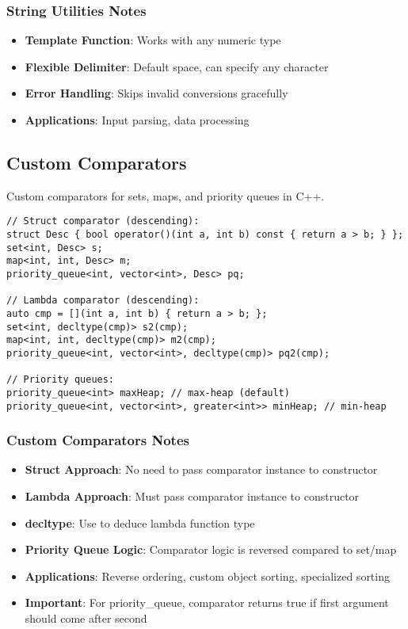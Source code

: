\documentclass[11pt,a4paper]{article}
\begin{document}
\subsubsection*{String Utilities Notes}
\begin{itemize}
\item \textbf{Template Function}: Works with any numeric type
\item \textbf{Flexible Delimiter}: Default space, can specify any character
\item \textbf{Error Handling}: Skips invalid conversions gracefully
\item \textbf{Applications}: Input parsing, data processing
\end{itemize}

\newpage

\subsection{Custom Comparators}
Custom comparators for sets, maps, and priority queues in C++.

\begin{lstlisting}[caption={Custom Comparator Approaches}]
// Struct comparator (descending):
struct Desc { bool operator()(int a, int b) const { return a > b; } };
set<int, Desc> s; 
map<int, int, Desc> m; 
priority_queue<int, vector<int>, Desc> pq;

// Lambda comparator (descending):
auto cmp = [](int a, int b) { return a > b; };
set<int, decltype(cmp)> s2(cmp);
map<int, int, decltype(cmp)> m2(cmp);
priority_queue<int, vector<int>, decltype(cmp)> pq2(cmp);

// Priority queues:
priority_queue<int> maxHeap; // max-heap (default)
priority_queue<int, vector<int>, greater<int>> minHeap; // min-heap
\end{lstlisting}

\subsubsection*{Custom Comparators Notes}
\begin{itemize}
\item \textbf{Struct Approach}: No need to pass comparator instance to constructor
\item \textbf{Lambda Approach}: Must pass comparator instance to constructor
\item \textbf{decltype}: Use to deduce lambda function type
\item \textbf{Priority Queue Logic}: Comparator logic is reversed compared to set/map
\item \textbf{Applications}: Reverse ordering, custom object sorting, specialized sorting
\item \textbf{Important}: For priority\_queue, comparator returns true if first argument should come after second
\end{itemize}
\end{document}
